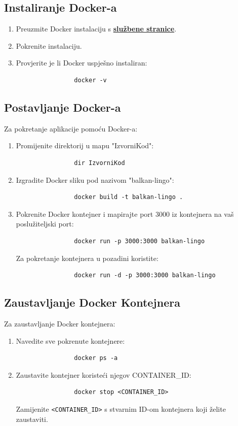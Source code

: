 		\subsection*{Instaliranje Docker-a}
		\begin{enumerate}
			\item Preuzmite Docker instalaciju s \textbf{\href{https://docs.docker.com/get-docker/}{službene stranice}}.
			\item Pokrenite instalaciju.
			\item Provjerite je li Docker uspješno instaliran:
			\begin{verbatim}
				docker -v
			\end{verbatim}
		\end{enumerate}

		\subsection*{Postavljanje Docker-a}
		Za pokretanje aplikacije pomoću Docker-a:
		\begin{enumerate}
			\item Promijenite direktorij u mapu "IzvorniKod":
			\begin{verbatim}
				dir IzvorniKod
			\end{verbatim}
			\item Izgradite Docker sliku pod nazivom "balkan-lingo":
			\begin{verbatim}
				docker build -t balkan-lingo .
			\end{verbatim}
			\item Pokrenite Docker kontejner i mapirajte port 3000 iz kontejnera na vaš poslužiteljski port:
			\begin{verbatim}
				docker run -p 3000:3000 balkan-lingo
			\end{verbatim}
			Za pokretanje kontejnera u pozadini koristite:
			\begin{verbatim}
				docker run -d -p 3000:3000 balkan-lingo
			\end{verbatim}
		\end{enumerate}
		
		\subsection*{Zaustavljanje Docker Kontejnera}
		Za zaustavljanje Docker kontejnera:
		\begin{enumerate}
			\item Navedite sve pokrenute kontejnere:
			\begin{verbatim}
				docker ps -a
			\end{verbatim}
			\item Zaustavite kontejner koristeći njegov CONTAINER\_ID:
			\begin{verbatim}
				docker stop <CONTAINER_ID>
			\end{verbatim}
			Zamijenite \texttt{<CONTAINER\_ID>} s stvarnim ID-om kontejnera koji želite zaustaviti.
		\end{enumerate}

